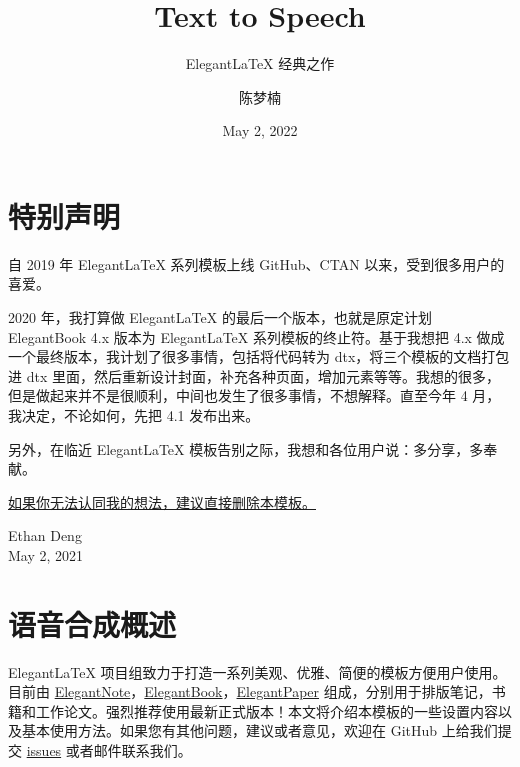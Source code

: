\documentclass[cn,10pt,math=newtx,citestyle=gb7714-2015,bibstyle=gb7714-2015]{elegantbook}
\title{Text to Speech}
\subtitle{Elegant\LaTeX{} 经典之作}
\author{陈梦楠}
\institute{Elegant\LaTeX{} Program}
\date{May 2, 2022}
\begin{document}
\maketitle
\frontmatter

\chapter*{特别声明}


自 2019 年 Elegant\LaTeX{} 系列模板上线 GitHub、CTAN 以来，受到很多用户的喜爱。

2020 年，我打算做 Elegant\LaTeX{} 的最后一个版本，也就是原定计划 ElegantBook 4.x 版本为 Elegant\LaTeX{} 系列模板的终止符。基于我想把 4.x 做成一个最终版本，我计划了很多事情，包括将代码转为 dtx，将三个模板的文档打包进 dtx 里面，然后重新设计封面，补充各种页面，增加元素等等。我想的很多，但是做起来并不是很顺利，中间也发生了很多事情，不想解释。直至今年 4 月，我决定，不论如何，先把 4.1 发布出来。

\vskip 0.5cm

另外，在临近 Elegant\LaTeX{} 模板告别之际，我想和各位用户说：多分享，多奉献。

\vskip 0.5cm

\underline{如果你无法认同我的想法，建议直接删除本模板。}

\vskip 1.5cm

\begin{flushright}
Ethan Deng\\
May 2, 2021
\end{flushright}

\tableofcontents

\mainmatter

\chapter{语音合成概述}

Elegant\LaTeX{} 项目组致力于打造一系列美观、优雅、简便的模板方便用户使用。目前由 \href{https://github.com/ElegantLaTeX/ElegantNote}{ElegantNote}，\href{https://github.com/ElegantLaTeX/ElegantBook}{ElegantBook}，\href{https://github.com/ElegantLaTeX/ElegantPaper}{ElegantPaper} 组成，分别用于排版笔记，书籍和工作论文。强烈推荐使用最新正式版本！本文将介绍本模板的一些设置内容以及基本使用方法。如果您有其他问题，建议或者意见，欢迎在 GitHub 上给我们提交 \href{https://github.com/ElegantLaTeX/ElegantBook/issues}{issues} 或者邮件联系我们。
\end{document}
